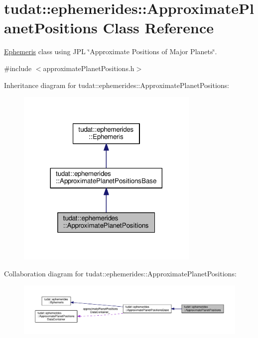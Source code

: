 \hypertarget{classtudat_1_1ephemerides_1_1ApproximatePlanetPositions}{}\section{tudat\+:\+:ephemerides\+:\+:Approximate\+Planet\+Positions Class Reference}
\label{classtudat_1_1ephemerides_1_1ApproximatePlanetPositions}


\hyperlink{classtudat_1_1ephemerides_1_1Ephemeris}{Ephemeris} class using J\+PL \char`\"{}\+Approximate Positions of Major Planets\char`\"{}.  




{\ttfamily \#include $<$approximate\+Planet\+Positions.\+h$>$}



Inheritance diagram for tudat\+:\+:ephemerides\+:\+:Approximate\+Planet\+Positions\+:
\nopagebreak
\begin{figure}[H]
\begin{center}
\leavevmode
\includegraphics[width=248pt]{classtudat_1_1ephemerides_1_1ApproximatePlanetPositions__inherit__graph}
\end{center}
\end{figure}


Collaboration diagram for tudat\+:\+:ephemerides\+:\+:Approximate\+Planet\+Positions\+:
\nopagebreak
\begin{figure}[H]
\begin{center}
\leavevmode
\includegraphics[width=350pt]{classtudat_1_1ephemerides_1_1ApproximatePlanetPositions__coll__graph}
\end{center}
\end{figure}
